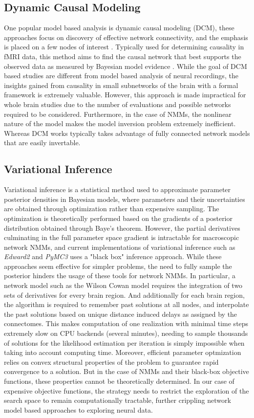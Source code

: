 \subsection{Dynamic Causal Modeling}
One popular model based analysis is dynamic causal modeling (DCM), these approaches focus on discovery of effective network connectivity, and the emphasis is placed on a few nodes of interest \cite{friston_network_2011}. Typically used for determining causality in fMRI data, this method aims to find the causal network that best supports the observed data as measured by Bayesian model evidence \cite{stephan_nonlinear_2008}. While the goal of DCM based studies are different from model based analysis of neural recordings, the insights gained from causality in small subnetworks of the brain with a formal framework is extremely valuable. However, this approach is made impractical for whole brain studies due to the number of evaluations and possible networks required to be considered. Furthermore, in the case of NMMs, the nonlinear nature of the model makes the model inversion problem extremely inefficient. Whereas DCM works typically takes advantage of fully connected network models that are easily invertable. 

\subsection{Variational Inference}
Variational inference is a statistical method used to approximate parameter posterior densities in Bayesian models, where parameters and their uncertainties are obtained through optimization rather than expensive sampling. The optimization is theoretically performed based on the gradients of a posterior distribution obtained through Baye's theorem. However, the partial derivatives culminating in the full parameter space gradient is intractable for macroscopic network NMMs, and current implementations of variational inference such as \emph{Edward2} \cite{tran2018simple} and \emph{PyMC3} \cite{Salvatier2016} uses a "black box" inference approach. While these approaches seem effective for simpler problems, the need to fully sample the posterior hinders the usage of these tools for network NMMs. In particular, a network model such as the Wilson Cowan model requires the integration of two sets of derivatives for every brain region. And additionally for each brain region, the algorithm is required to remember past solutions at all nodes, and interpolate the past solutions based on unique distance induced delays as assigned by the connectomes. This makes computation of one realization with minimal time steps extremely slow on CPU backends (several minutes), needing to sample thousands of solutions for the likelihood estimation per iteration is simply impossible when taking into account computing time. Moreover, efficient parameter optmization relies on convex structural properties of the problem to guarantee rapid convergence to a solution. But in the case of NMMs and their black-box objective functions, these properties cannot be theoretically determined. In our case of expensive objective functions, the strategy needs to restrict the exploration of the search space to remain computationally tractable, further crippling network model based approaches to exploring neural data.

